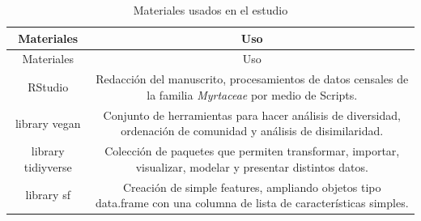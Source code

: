 \documentclass[11pt,]{article}
\begin{document}
\begin{longtable}[]{@{}cc@{}}
\caption{\label{tab:materiales} Materiales usados en el
estudio}\tabularnewline
\toprule
\begin{minipage}[b]{0.14\columnwidth}\centering\strut
Materiales\strut
\end{minipage} & \begin{minipage}[b]{0.80\columnwidth}\centering\strut
Uso\strut
\end{minipage}\tabularnewline
\midrule
\endfirsthead
\toprule
\begin{minipage}[b]{0.14\columnwidth}\centering\strut
Materiales\strut
\end{minipage} & \begin{minipage}[b]{0.80\columnwidth}\centering\strut
Uso\strut
\end{minipage}\tabularnewline
\midrule
\endhead
\begin{minipage}[t]{0.14\columnwidth}\centering\strut
RStudio\strut
\end{minipage} & \begin{minipage}[t]{0.80\columnwidth}\centering\strut
Redacción del manuscrito, procesamientos de datos censales de la familia
\emph{Myrtaceae} por medio de Scripts.\strut
\end{minipage}\tabularnewline
\begin{minipage}[t]{0.14\columnwidth}\centering\strut
library vegan\strut
\end{minipage} & \begin{minipage}[t]{0.80\columnwidth}\centering\strut
Conjunto de herramientas para hacer análisis de diversidad, ordenación
de comunidad y análisis de disimilaridad.\strut
\end{minipage}\tabularnewline
\begin{minipage}[t]{0.14\columnwidth}\centering\strut
library tidiyverse\strut
\end{minipage} & \begin{minipage}[t]{0.80\columnwidth}\centering\strut
Colección de paquetes que permiten transformar, importar, visualizar,
modelar y presentar distintos datos.\strut
\end{minipage}\tabularnewline
\begin{minipage}[t]{0.14\columnwidth}\centering\strut
library sf\strut
\end{minipage} & \begin{minipage}[t]{0.80\columnwidth}\centering\strut
Creación de simple features, ampliando objetos tipo data.frame con una
columna de lista de características simples.\strut

\end{minipage}
\end{longtable}
\end{document}
